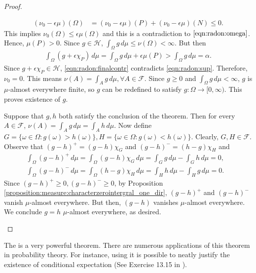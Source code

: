 \begin{proof}
\begin{step}
\begin{align*}
    (\nu_0 - \epsilon \mu)(\Omega) &= (\nu_0 - \epsilon \mu) (P) + (\nu_0 - \epsilon \mu) (N)
                                        \leq 0.
\end{align*}
This implies $\nu_0(\Omega) \leq \epsilon \mu (\Omega)$ and this is a contradiction to $\ref{eqn:radon:omega}$. Hence, $\mu(P) > 0$. Since $g \in \mathcal{H}$, $\int_{\Omega} g \,d\mu \leq \nu(\Omega) < \infty$. But then
\begin{align}
    \label{eqn:radon:finalcontr}
    \int_{\Omega} (g + \epsilon \chi_P) \,d\mu = \int_{\Omega} g  \,d\mu  + \epsilon \mu(P) > \int_{\Omega} g \,d\mu = \alpha.
\end{align}
Since $g + \epsilon \chi_P \in \mathcal{H}$, \ref{eqn:radon:finalcontr} contradicts \ref{eqn:radon:sup}. Therefore, $\nu_0 = 0$. This means $\nu(A) = \int_{A} g \,d\mu, \forall A \in \mathcal{F}$. Since $g \geq 0$ and $\int_{\Omega} g \,d\mu < \infty$, $g$ is $\mu$-almost everywhere finite, so $g$ can be redefined to satisfy $g : \Omega \to [0, \infty)$. This proves existence of $g$. 
\end{step}
\clearpage
\begin{step}[Uniqueness]
Suppose that $g, h$ both satisfy the conclusion of the theorem. Then for every $A \in \mathcal{F}$, $\nu(A) = \int_A g \,d\mu = \int_A h \,d\mu$. Now define $G = \{ \omega \in \Omega : g (\omega) > h (\omega) \}, H = \{ \omega \in \Omega : g (\omega) < h (\omega) \}$.
Clearly, $G, H \in \mathcal{F}$. Observe that $(g - h)^+ = (g - h) \chi_G$ and  $(g - h)^- = (h - g) \chi_H$ and
\begin{align*}
    \int_{\Omega} (g - h)^+ \,d\mu = \int_{\Omega} (g - h) \chi_G \,d\mu = \int_{G} g \,d\mu - \int_{G} h \,d\mu = 0, & \\
    \int_{\Omega} (g - h)^- \,d\mu = \int_{\Omega} (h - g) \chi_H \,d\mu = \int_{H} h \,d\mu - \int_{H} g \,d\mu = 0.
\end{align*}
Since $(g - h)^+ \geq 0, (g - h)^- \geq 0$, by Proposition \ref{proposition:measure:characterzerointergral_one_dir}, $(g - h)^+$ and $(g - h)^-$ vanish $\mu$-almost everywhere. But then, $(g - h)$ vanishes $\mu$-almost everywhere. We conclude $g = h$ $\mu$-almost everywhere, as desired.
\end{step}
\end{proof}

The  is a very powerful theorem. There are numerous applications of this theorem in probability theory.
For instance, using  it is possible to neatly justify the existence of conditional expectation (See Exercise 13.15 in \cite{bass2011real}). 

